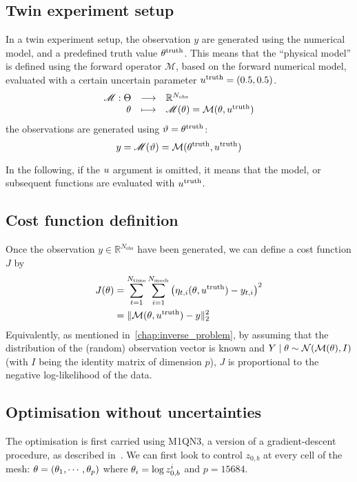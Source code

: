 \documentclass[../../Main_ManuscritThese.tex]{subfiles}
\newcommand{\zob}{z_{0,b}}
\begin{document}
\subsection{Twin experiment setup}
In a twin experiment setup, the observation $y$ are generated using
the numerical model, and a predefined truth value
$\theta^{\mathrm{truth}}$.  This means that the ``physical model'' is
defined using the forward operator $\mathscr{M}$, based on the forward
numerical model, evaluated with a certain uncertain parameter
$u^{\mathrm{truth}} = (0.5, 0.5)$.
\begin{equation}
  \label{eq:twin_exp}
  \begin{array}{rcl}
    \mathscr{M}: \Theta &\longrightarrow & \mathbb{R}^{N_{\mathrm{obs}}} \\
      \theta & \longmapsto &\mathscr{M}(\theta) = \mathcal{M}(\theta, u^{\mathrm{truth}})
  \end{array}
\end{equation}
 the observations are generated using $\vartheta=\theta^{\mathrm{truth}}$:
\begin{equation}
  y = \mathscr{M}(\vartheta) = \mathcal{M}(\theta^{\mathrm{truth}}, u^{\mathrm{truth}})
\end{equation}

In the following, if the $u$ argument is omitted, it means that the model, or subsequent functions are evaluated with $u^{\mathrm{truth}}$.
\subsection{Cost function definition}
Once the observation $y \in \mathbb{R}^{N_{\mathrm{obs}}}$ have been generated, we can
define a cost function $J$ by
\begin{align}
  \label{eq:cost_fun_definition}
  J(\theta) &= \sum_{t=1}^{ N_{\mathrm{time}}}\sum_{i=1}^{N_{\mathrm{mesh}}}  \left(\eta_{t,i}(\theta,u^{\mathrm{truth}}) - y_{t, i}\right)^2 \\
         &= \|\mathcal{M}(\theta,u^{\mathrm{truth}}) - y\|_2^2
\end{align}
Equivalently, as mentioned in~\cref{chap:inverse_problem}, by assuming
that the distribution of the (random) observation vector is known and
$Y \mid \theta \sim \mathcal{N}(\mathcal{M}(\theta), I)$ (with $I$ being the
identity matrix of dimension $p$), $J$ is proportional to the negative log-likelihood of the data.

\subsection{Optimisation without uncertainties}
\label{ssec:optim_gradient}
The optimisation is first carried using M1QN3, a version of a
gradient-descent procedure, as described
in~\cite{gilbert_numerical_1989}. We can first look to control $\zob$
at every cell of the mesh: $\theta = (\theta_1,\cdots, \theta_p)$ where
$\kk_i = \log\zob^i$ and $p=\num{15684}$.
\end{document}
